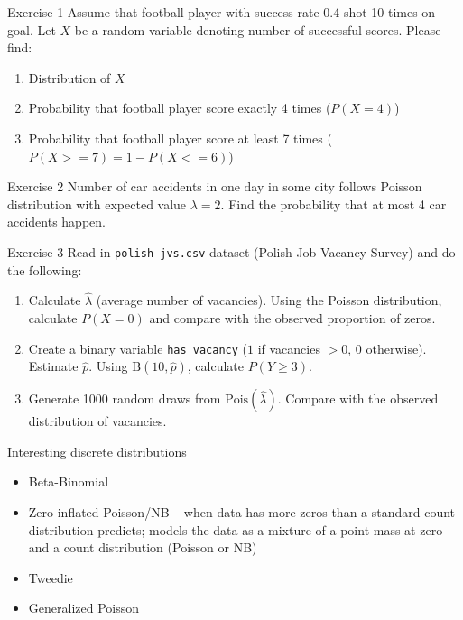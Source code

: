 \documentclass[10pt,ignorenonframetext,aspectratio=169]{beamer}
\begin{document}
\begin{frame}{Exercise 1}
    Assume that football player with success rate 0.4 shot 10 times on goal. Let $X$ be a random variable denoting number of successful scores.  Please find:

\begin{enumerate}
    \item Distribution of $X$
    \item Probability that football player score exactly 4 times ($P(X=4)$)
    \item Probability that football player score at least 7 times ($P(X>=7) = 1- P(X <= 6)$)
\end{enumerate}

\end{frame}

\begin{frame}{Exercise 2}
    Number of car accidents in one day in some city follows Poisson distribution with expected value $\lambda=2$. Find the probability that at most 4 car accidents happen.
\end{frame}

\begin{frame}{Exercise 3}
    Read in \texttt{polish-jvs.csv} dataset (Polish Job Vacancy Survey) and do the following:
\begin{enumerate}
    \item Calculate $\hat{\lambda}$ (average number of vacancies). Using the Poisson distribution, calculate $P(X=0)$ and compare with the observed proportion of zeros.
    \item Create a binary variable \texttt{has\_vacancy} ($1$ if vacancies $> 0$, $0$ otherwise). Estimate $\hat{p}$. Using $\mathrm{B}(10, \hat{p})$, calculate $P(Y \geq 3)$.
    \item Generate 1000 random draws from $\mathrm{Pois}(\hat{\lambda})$. Compare with the observed distribution of vacancies.
\end{enumerate}
\end{frame}

\begin{frame}{Interesting discrete distributions}
\begin{itemize}
    \item Beta-Binomial
    \item Zero-inflated Poisson/NB -- when data has more zeros than a standard count distribution predicts; models the data as a mixture of a point mass at zero and a count distribution (Poisson or NB)
    \item Tweedie
    \item Generalized Poisson
\end{itemize}
\end{frame}
\end{document}
